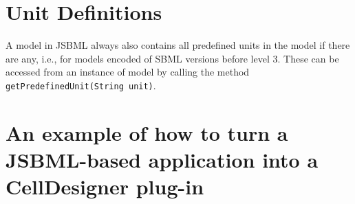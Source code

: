 \documentclass[
  letterpaper,
  11pt,
  headsepline,
  pointlessnumbers,
  tablecaptionabove,
  headinclude,
  appendixprefix,
  idxtotoc,
  bibtotoc,
  titlepage
]{scrartcl}
\begin{document}
\section{Unit Definitions}

A model in JSBML always also contains all predefined units in the model
if there are any, i.e., for models encoded of SBML versions before level
3. These can be accessed from an instance of model by calling the method
\verb!getPredefinedUnit(String unit)!.

\appendix

\section{An example of how to turn a JSBML-based application into a CellDesigner
plug-in}
\end{document}
